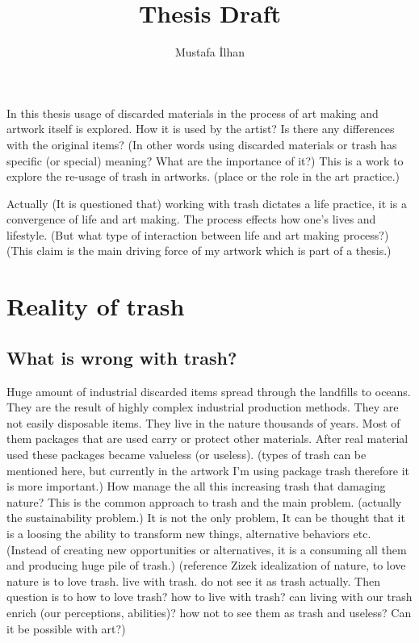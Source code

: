 \documentclass{article}
\title{Thesis Draft}
\author{Mustafa İlhan}
\begin{document}
\maketitle

In this thesis usage of discarded materials in the process of art making and artwork itself is explored. How it is used by the artist? Is there any differences with the original items? (In other words using discarded materials or trash has specific (or special) meaning? What are the importance of it?) This is a work to explore the re-usage of trash in artworks. (place or the role in the art practice.)

Actually (It is questioned that) working with trash dictates a life practice, it is a convergence of life and art making. The process effects how one's lives and lifestyle. (But what type of interaction between life and art making process?) (This claim is the main driving force of my artwork which is part of a thesis.)

\section{Reality of trash}
\subsection{What is wrong with trash?}
Huge amount of industrial discarded items spread through the landfills to oceans. They are the result of highly complex industrial production methods. They are not easily disposable items. They live in the nature thousands of years. Most of them packages that are used carry or protect other materials. After real material used these packages became valueless (or useless). (types of trash can be mentioned here, but currently in the artwork I'm using package trash therefore it is more important.) How manage the all this increasing trash that damaging nature?  This is the common approach to trash and the main problem. (actually the sustainability problem.) It is not the only problem, It can be thought that it is a loosing the ability to transform new things, alternative behaviors etc. (Instead of creating new opportunities or alternatives, it is a consuming all them and producing huge pile of trash.) (reference Zizek idealization of nature, to love nature is to love trash. live with trash. do not see it as trash actually. Then question is to how to love trash? how to live with trash? can living with our trash enrich (our perceptions, abilities)? how not to see them as trash and useless? Can it be possible with art?)
\end{document}
